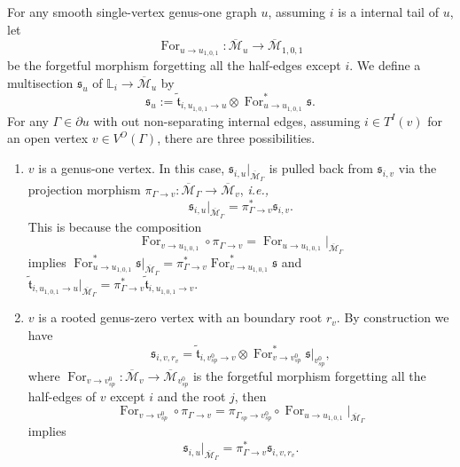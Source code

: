 \documentclass[11pt]{amsart}
\theoremstyle{definition}
\theoremstyle{remark}
\newcommand{\For}{\operatorname{For}}
\newcommand{\<}{\left<}
\renewcommand{\>}{\right>}
\numberwithin{equation}{section}
\def\Mbar{{\overline{\mathcal M}}}
\begin{document}
For any smooth single-vertex genus-one graph $u$, assuming $i$ is a internal tail of $u$, let 
$$
\For_{u\to u_{1,0,1}}\colon \Mbar_{u}\to \Mbar_{1,0,1}
$$
be the forgetful morphism forgetting all the half-edges except $i$. We define a multisection $\mathfrak{s}_{u}$ of $\mathbb L_i\to \Mbar_{u}$ by
$$
\mathfrak{s}_{u}:=\tilde{\mathfrak t}_{i,u_{1,0,1}\to u}\otimes \For_{u\to u_{1,0,1}}^*\mathfrak s.
$$
For any $\Gamma \in \partial u$ with out non-separating internal edges, assuming $i\in T^I(v)$ for an open vertex $v \in V^O(\Gamma)$, there are three possibilities.
\begin{enumerate}
    \item $v$ is a genus-one vertex. In this case, $\mathfrak s_{i,u}\vert_{\Mbar_{\Gamma}}$ is pulled back from $\mathfrak s_{i,v}$ via the projection morphism $\pi_{\Gamma\to v}\colon \Mbar_\Gamma \to \Mbar_v$, \textit{i.e.,}
    \begin{equation}\label{eq behaviour of trr genus one}
    \mathfrak s_{i,u}\vert_{\Mbar_{\Gamma}}=\pi^*_{\Gamma\to v} \mathfrak s_{i,v}.
    \end{equation}
    This is because the composition    \begin{equation*}
        \For_{v\to u_{1,0,1}}\circ\pi_{\Gamma\to v}=\For_{u\to u_{1,0,1}}\vert_{\Mbar_\Gamma}
    \end{equation*} 
implies $\For_{u\to u_{1,0,1}}^*\mathfrak s\vert_{\Mbar_{\Gamma}}=\pi_{\Gamma\to v}^*\For_{v\to u_{1,0,1}}^*\mathfrak s$ and $\tilde{\mathfrak t}_{i,u_{1,0,1}\to u}\vert_{\Mbar_{\Gamma}}=\pi_{\Gamma\to v}^*\tilde{\mathfrak t}_{i,u_{1,0,1}\to v}$. %
    \item $v$ is a rooted genus-zero vertex with an boundary root $r_v$. 
    By construction we have
    $$
     \mathfrak s_{i,v,r_v}=\tilde{\mathfrak t}_{i, v^0_{sp}\to v}\otimes \For^*_{v\to v_{sp}^0}\mathfrak s\vert_{v^0_{sp}},
    $$
    where $\For_{v\to v_{sp}^0}\colon \Mbar_v\to \Mbar_{v_{sp}^0}$ is the forgetful morphism forgetting all the half-edges of $v$ except $i$ and the root $j$, then 
    $$
    \For_{v\to v^0_{sp}}\circ\pi_{\Gamma\to v}=\pi_{\Gamma_{sp}\to v^0_{sp}}\circ\For_{u\to u_{1,0,1}}\vert_{\Mbar_\Gamma}
    $$
    implies 
    \begin{equation}\label{eq behaviour of trr 1 rooted}
    \mathfrak s_{i,u}\vert_{\Mbar_{\Gamma}}=\pi^*_{\Gamma \to v}\mathfrak s_{i,v,r_v}.
    \end{equation}
    

\end{enumerate}
\end{document}
